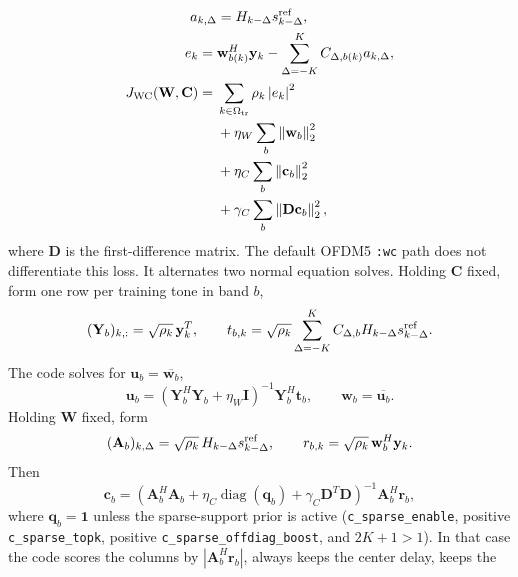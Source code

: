 \documentclass[journal]{IEEEtran}
\newcommand{\norm}[1]{\left\lVert #1 \right\rVert}
\newcommand{\abs}[1]{\left\lvert #1 \right\rvert}
\begin{document}
\begin{equation}
\begin{aligned}
  a_{k,\Delta}&=H_{k-\Delta}s_{k-\Delta}^{\rm ref},\\
  e_k
  ={}&\mathbf w_{b(k)}^H\mathbf y_k
      -\sum_{\Delta=-K}^{K}
        C_{\Delta,b(k)}a_{k,\Delta},\\
  J_{\rm WC}(\mathbf W,\mathbf C)
  ={}&\sum_{k\in\Omega_{\rm tr}}\rho_k\abs{e_k}^2\\
  &+\eta_W\sum_b\norm{\mathbf w_b}_2^2\\
  &+\eta_C\sum_b\norm{\mathbf c_b}_2^2\\
  &+\gamma_C\sum_b\norm{\mathbf D\mathbf c_b}_2^2 ,
\end{aligned}
  \label{eq:ofdm5-wc-loss}
\end{equation}
where \(\mathbf D\) is the first-difference matrix. The default OFDM5
\texttt{:wc} path does not differentiate this loss. It alternates two normal
equation solves. Holding \(\mathbf C\) fixed, form one row per training tone in
band \(b\),
\begin{equation}
  (\mathbf Y_b)_{k,:}=\sqrt{\rho_k}\,\mathbf y_k^T,\qquad
  t_{b,k}=\sqrt{\rho_k}\sum_{\Delta=-K}^{K}
      C_{\Delta,b}H_{k-\Delta}s_{k-\Delta}^{\rm ref}.
  \label{eq:ofdm5-w-matrix}
\end{equation}
The code solves for \(\mathbf u_b=\overline{\mathbf w_b}\),
\begin{equation}
  \mathbf u_b
  =(\mathbf Y_b^H\mathbf Y_b+\eta_W\mathbf I)^{-1}\mathbf Y_b^H\mathbf t_b,
  \qquad
  \mathbf w_b=\overline{\mathbf u_b}.
  \label{eq:ofdm5-w-step}
\end{equation}
Holding \(\mathbf W\) fixed, form
\begin{equation}
  (\mathbf A_b)_{k,\Delta}
  =\sqrt{\rho_k}\,H_{k-\Delta}s_{k-\Delta}^{\rm ref},\qquad
  r_{b,k}=\sqrt{\rho_k}\,\mathbf w_b^H\mathbf y_k .
  \label{eq:ofdm5-c-matrix}
\end{equation}
Then
\begin{equation}
  \mathbf c_b
  =\left(\mathbf A_b^H\mathbf A_b
      +\eta_C\operatorname{diag}(\mathbf q_b)
      +\gamma_C\mathbf D^T\mathbf D\right)^{-1}
    \mathbf A_b^H\mathbf r_b ,
  \label{eq:ofdm5-c-step}
\end{equation}
where \(\mathbf q_b=\mathbf 1\) unless the sparse-support prior is active
(\texttt{c\_sparse\_enable}, positive \texttt{c\_sparse\_topk}, positive
\texttt{c\_sparse\_offdiag\_boost}, and \(2K+1>1\)). In that case the code
scores the columns by
\(\abs{\mathbf A_b^H\mathbf r_b}\), always keeps the center delay, keeps the
\end{document}
